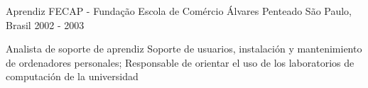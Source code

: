 \begin{cventries}
  \cventry
    {Aprendiz} %
    {FECAP - Fundação Escola de Comércio Álvares Penteado} %
    {São Paulo, Brasil} %
    {2002 - 2003} %
    {
      \begin{cvitems} %
        \item {Analista de soporte de aprendiz
Soporte de usuarios, instalación y mantenimiento de ordenadores personales;
Responsable de orientar el uso de los laboratorios de computación de la universidad}
      \end{cvitems}
    }

\end{cventries}
